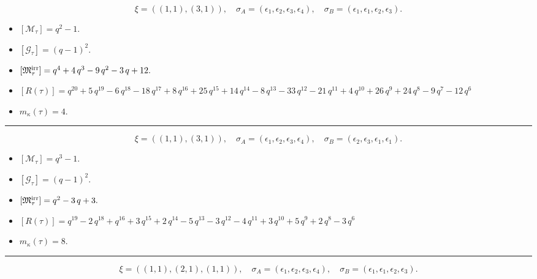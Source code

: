 \documentclass[10pt,a4paper]{amsart}
\begin{document}
$$\xi = ({(1, 1)}, {(3, 1)}),\quad \sigma_A = ({{\epsilon_1}}, {{\epsilon_2, \epsilon_3, \epsilon_4}}),\quad \sigma_B = ({{\epsilon_1}}, {{\epsilon_1, \epsilon_2, \epsilon_3}}).$$

\begin{itemize}
 \item $[\mathcal{M}_{\tau}] = q^{2} - 1 .$

 \item $[\mathcal{G}_{\tau}] = {\left(q - 1\right)}^{2} .$

 \item $[{\frak M}_{\tau}^{\textrm{irr}}] = q^{4} + 4 \, q^{3} - 9 \, q^{2} - 3 \, q + 12 .$

 \item $[R(\tau)] = q^{20} + 5 \, q^{19} - 6 \, q^{18} - 18 \, q^{17} + 8 \, q^{16} + 25 \, q^{15} + 14 \, q^{14} - 8 \, q^{13} - 33 \, q^{12} - 21 \, q^{11} + 4 \, q^{10} + 26 \, q^{9} + 24 \, q^{8} - 9 \, q^{7} - 12 \, q^{6} $

 \item $m_{\kappa}(\tau) = 4 .$

 \end{itemize}
\noindent\rule{8cm}{0.4pt}

$$\xi = ({(1, 1)}, {(3, 1)}),\quad \sigma_A = ({{\epsilon_1}}, {{\epsilon_2, \epsilon_3, \epsilon_4}}),\quad \sigma_B = ({{\epsilon_2}}, {{\epsilon_3, \epsilon_1, \epsilon_1}}).$$

\begin{itemize}
 \item $[\mathcal{M}_{\tau}] = q^{3} - 1 .$

 \item $[\mathcal{G}_{\tau}] = {\left(q - 1\right)}^{2} .$

 \item $[{\frak M}_{\tau}^{\textrm{irr}}] = q^{2} - 3 \, q + 3 .$

 \item $[R(\tau)] = q^{19} - 2 \, q^{18} + q^{16} + 3 \, q^{15} + 2 \, q^{14} - 5 \, q^{13} - 3 \, q^{12} - 4 \, q^{11} + 3 \, q^{10} + 5 \, q^{9} + 2 \, q^{8} - 3 \, q^{6} $

 \item $m_{\kappa}(\tau) = 8 .$

 \end{itemize}
\noindent\rule{8cm}{0.4pt}

$$\xi = ({(1, 1)}, {(2, 1), (1, 1)}),\quad \sigma_A = ({{\epsilon_1}}, {{\epsilon_2, \epsilon_3}, {\epsilon_4}}),\quad \sigma_B = ({{\epsilon_1}}, {{\epsilon_1, \epsilon_2}, {\epsilon_3}}).$$
\end{document}

